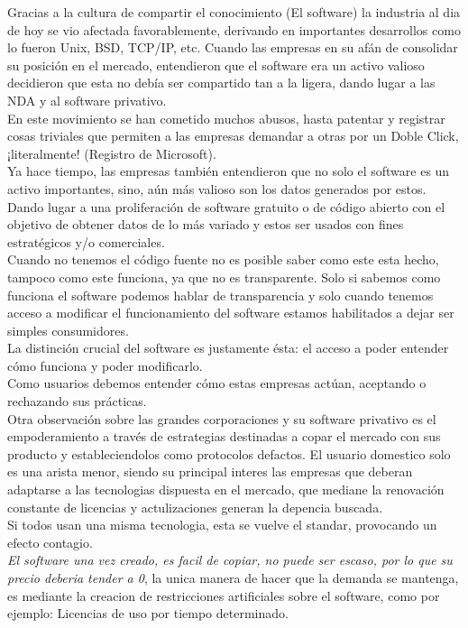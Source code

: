 Gracias a la cultura de compartir el conocimiento (El software) la industria al dia de hoy se vio afectada favorablemente, derivando en importantes desarrollos como lo fueron Unix, BSD, TCP/IP, etc.
Cuando las empresas en su afán de consolidar su posición en el mercado, entendieron que el software era un activo valioso decidieron que esta no debía ser compartido tan a la ligera, dando lugar a las NDA y al software privativo.
\\
En este movimiento se han cometido muchos abusos, hasta patentar y registrar cosas triviales que permiten a las empresas demandar a otras por un Doble Click, ¡literalmente! (Registro de Microsoft).
\\
Ya hace tiempo, las empresas también entendieron  que no solo el software es un activo importantes, sino, aún más valioso son los datos generados por estos. Dando lugar a una proliferación de software gratuito o de código abierto con el objetivo de obtener datos de lo más variado y estos ser usados con fines estratégicos y/o comerciales.
\\
Cuando no tenemos el código fuente no es posible saber como este esta hecho, tampoco como este funciona, ya que no es transparente. 
Solo si sabemos como funciona el software podemos hablar de transparencia y solo cuando tenemos acceso a modificar el funcionamiento del software estamos habilitados a dejar ser simples consumidores.
\\
La distinción crucial del software es justamente ésta: el acceso a poder entender cómo funciona y poder modificarlo. 
\\
Como usuarios debemos entender cómo estas empresas actúan, aceptando o rechazando sus prácticas.
\\
Otra observación sobre las grandes corporaciones y su software privativo es el empoderamiento a través de estrategias destinadas a copar el mercado con sus producto y estableciendolos como protocolos defactos.
El usuario domestico solo es una arista menor, siendo su principal interes las empresas que deberan adaptarse a las tecnologias dispuesta en el mercado, que mediane la renovación constante de licencias y actulizaciones generan la depencia buscada.
\\
Si todos usan una misma tecnologia, esta se vuelve el standar, provocando un efecto contagio.
\\
\emph{El software una vez creado, es facil de copiar, no puede ser escaso, por lo que su precio deberia tender a 0}, la unica manera de hacer que la demanda se mantenga, es mediante la creacion de restricciones artificiales sobre el software, como por ejemplo: Licencias de uso por tiempo determinado.



